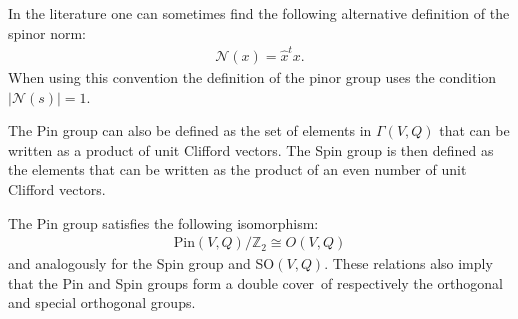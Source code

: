     \begin{remark}
        In the literature one can sometimes find the following alternative definition of the spinor norm:
        \begin{gather}
            \mathcal{N}(x) = \hat{x}^tx.
        \end{gather}
        When using this convention the definition of the pinor group uses the condition $|\mathcal{N}(s)| = 1$.
    \end{remark}

    \begin{adefinition}
        The Pin group can also be defined as the set of elements in $\Gamma(V, Q)$ that can be written as a product of unit Clifford vectors. The Spin group is then defined as the elements that can be written as the product of an even number of unit Clifford vectors.
    \end{adefinition}

    \begin{property}\label{clifford:pin_group}
        The Pin group satisfies the following isomorphism:
        \begin{gather}
            \text{Pin}(V, Q)/\mathbb{Z}_2 \cong O(V, Q)
        \end{gather}
        and analogously for the Spin group and SO$(V, Q)$. These relations also imply that the Pin and Spin groups form a double cover\footnotemark\ of respectively the orthogonal and special orthogonal groups.
    \end{property}

